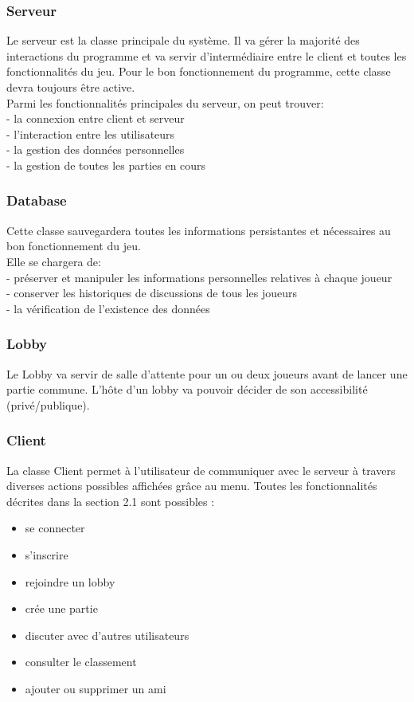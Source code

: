 \documentclass[a4paper,12pt]{article}
\begin{document}
\subsubsection{Serveur}
Le serveur est la classe principale du système. Il va gérer la majorité des interactions du programme et va servir d'intermédiaire entre le client et toutes les fonctionnalités du jeu. Pour le bon fonctionnement du programme, cette classe devra toujours être active.\\
Parmi les fonctionnalités principales du serveur, on peut trouver:\\
- la connexion entre client et serveur\\
- l'interaction entre les utilisateurs\\
- la gestion des données personnelles\\
- la gestion de toutes les parties en cours
\subsubsection{Database}
Cette classe sauvegardera toutes les informations persistantes et nécessaires au bon fonctionnement du jeu.\\
Elle se chargera de:\\
- préserver et manipuler les informations personnelles relatives à chaque joueur\\
- conserver les historiques de discussions de tous les joueurs\\
- la vérification de l'existence des données
\subsubsection{Lobby}
Le Lobby va servir de salle d'attente pour un ou deux joueurs avant de lancer une partie commune. L'hôte d'un lobby va pouvoir décider de son accessibilité (privé/publique).

\subsubsection{Client}
La classe Client permet à l'utilisateur de communiquer avec le serveur à travers diverses actions possibles affichées grâce au menu.
Toutes les fonctionnalités décrites dans la section 2.1 sont possibles :
\begin{itemize}
    \item se connecter
    \item s'inscrire
    \item rejoindre un lobby
    \item crée une partie
    \item discuter avec d'autres utilisateurs
    \item consulter le classement
    \item ajouter ou supprimer un ami
\end{itemize}
\end{document}
